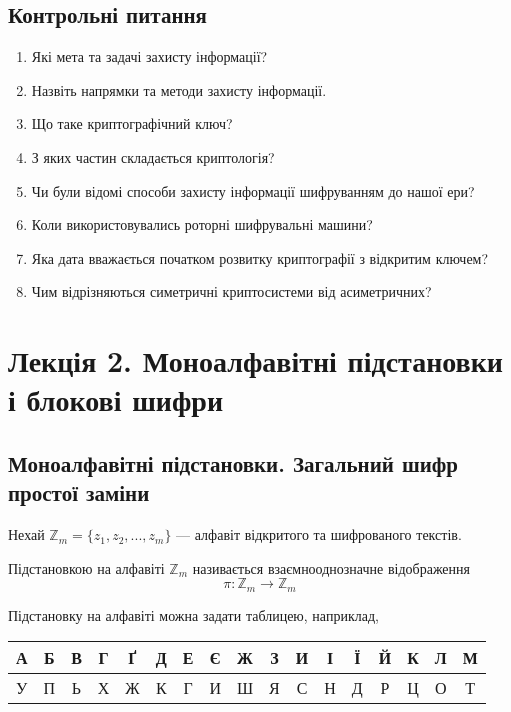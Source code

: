 \subsection{Контрольні питання}
\begin{enumerate}
    \item Які мета та задачі захисту інформації?
    \item Назвіть напрямки та методи захисту інформації.
    \item Що таке криптографічний ключ?
    \item З яких частин складається криптологія?
    \item Чи були відомі способи захисту інформації шифруванням до нашої ери?
    \item Коли використовувались роторні шифрувальні машини?
    \item Яка дата вважається початком розвитку криптографії з відкритим ключем?
    \item Чим відрізняються симетричні криптосистеми від асиметричних?
\end{enumerate}

\section[Моноалфавітні підстановки і блокові шифри]{Лекція 2. Моноалфавітні підстановки і блокові шифри}


\subsection{Моноалфавітні підстановки. Загальний шифр простої заміни}

Нехай $\mathbb{Z}_m = \{z_1, z_2, ..., z_m\}$ --- алфавіт відкритого та шифрованого текстів.

\begin{definition}
    Підстановкою на алфавіті $\mathbb{Z}_m$ називається взаємнооднозначне відображення
    $$\pi : \mathbb{Z}_m \rightarrow \mathbb{Z}_m$$
\end{definition}

Підстановку на алфавіті можна задати таблицею, наприклад,

\begin{table}
\centering
\begin{tabular}{|c|c|c|c|c|c|c|c|c|c|c|c|c|c|c|c|c|}
    \hline А & Б & В & Г & Ґ & Д & Е & Є & Ж & З & И & І & Ї & Й & К & Л & М  \\
    \hline У & П & Ь & Х & Ж & К & Г & И & Ш & Я & С & Н & Д & Р & Ц & О & Т  \\
    \hline
\end{tabular}
\end{table}

